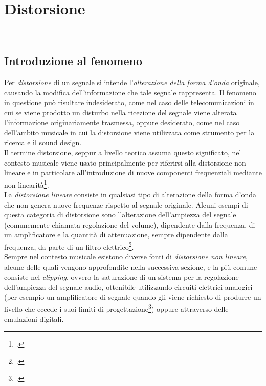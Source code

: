 
\chapter{Distorsione}
\label{cap:distorsione}

\\

\section{Introduzione al fenomeno}

Per \textit{distorsione} di un segnale si intende l'\textit{alterazione della forma d'onda} originale, causando la modifica dell'informazione che tale segnale rappresenta. Il fenomeno in questione può risultare indesiderato, come nel caso delle telecomunicazioni in cui se viene prodotto un disturbo nella ricezione del segnale viene alterata l'informazione originariamente trasmessa, oppure desiderato, come nel caso dell'ambito musicale in cui la distorsione viene utilizzata come strumento per la ricerca e il sound design. \\
Il termine distorsione, seppur a livello teorico assuma questo significato, nel contesto musicale viene usato principalmente per riferirsi alla distorsione non lineare e in particolare all'introduzione di nuove componenti frequenziali mediante non linearità\footcite{white-leouie:theaudiodictionary}. \\
La \textit{distorsione lineare} consiste in qualsiasi tipo di alterazione della forma d'onda che non genera nuove frequenze rispetto al segnale originale. Alcuni esempi di questa categoria di distorsione sono l'alterazione dell'ampiezza del segnale (comunemente chiamata regolazione del volume), dipendente dalla frequenza, di un amplificatore e la quantità di attenuazione, sempre dipendente dalla frequenza, da parte di un filtro elettrico\footcite{kleiner:acousticsaudiotech}. \\
Sempre nel contesto musicale esistono diverse fonti di \textit{distorsione non lineare}, alcune delle quali vengono approfondite nella successiva sezione, e la più comune consiste nel \textit{clipping}, ovvero la saturazione di un sistema per la regolazione dell'ampiezza del segnale audio, ottenibile utilizzando circuiti elettrici analogici (per esempio un amplificatore di segnale quando gli viene richiesto di produrre un livello che eccede i suoi limiti di progettazione\footcite{davis-jones:soundreinforcement}) oppure attraverso delle emulazioni digitali.

